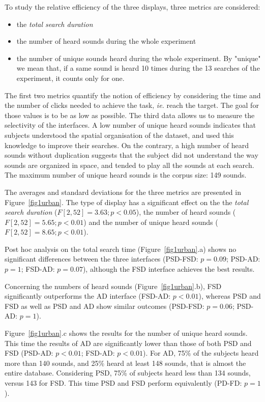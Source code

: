 \documentclass{aes2e}
\begin{document}
To study the relative efficiency of the three displays, three metrics are considered: 

\begin{itemize}
\item the \textit{total search duration}
\item the number of heard sounds during the whole experiment
\item the number of unique sounds heard during the whole experiment. By "unique" we mean that, if a same sound is heard 10 times during the 13 searches of the  experiment, it counts only for one. 
\end{itemize}

The first two metrics quantify the notion of efficiency by considering the time and the number of clicks needed to achieve the task, \textit{ie.} reach the target. The goal for those values is to be as low as possible. The third data allows us to measure the selectivity of the interfaces. A low number of unique heard sounds indicates that subjects understood the spatial organisation of the dataset, and used this knowledge to improve their searches. On the contrary, a high number of heard sounds without duplication suggests that the subject did not understand the way sounds are organized in space, and tended to play all the sounds at each search. The maximum number of unique heard sounds is the corpus size: 149 sounds.

The averages and standard deviations for the three metrics are presented in Figure~\ref{fig1urban}. The type of display has a significant effect on the the \textit{total search duration} ($F[2,52]=3.63; p<0.05$), the number of heard sounds ($F[2,52]=5.65; p<0.01$) and the number of unique heard sounds ($F[2,52]=8.65; p<0.01$). 

Post hoc analysis on the total search time (Figure~\ref{fig1urban}.a) shows no significant differences between the three interfaces (PSD-FSD: $p=0.09$; PSD-AD: $p=1$; FSD-AD: $p=0.07$), although the FSD interface achieves the best results.

Concerning the numbers of heard sounds (Figure~\ref{fig1urban}.b), FSD significantly outperforms the AD interface (FSD-AD: $p<0.01$),  whereas PSD and FSD as well as PSD and AD show similar outcomes (PSD-FSD: $p=0.06$; PSD-AD: $p=1$).

Figure~\ref{fig1urban}.c shows the results for the number of unique heard sounds. This time the results of AD are significantly lower than those of both PSD and FSD (PSD-AD: $p<0.01$; FSD-AD: $p<0.01$).  For AD, 75\% of the subjects heard more than 140 sounds, and 25\% heard at least 148 sounds, that is almost the entire database. Considering PSD, 75\% of subjects heard less than 134 sounds, versus 143 for FSD. This time PSD and FSD perform equivalently (PD-FD: $p=1$).
\end{document}
